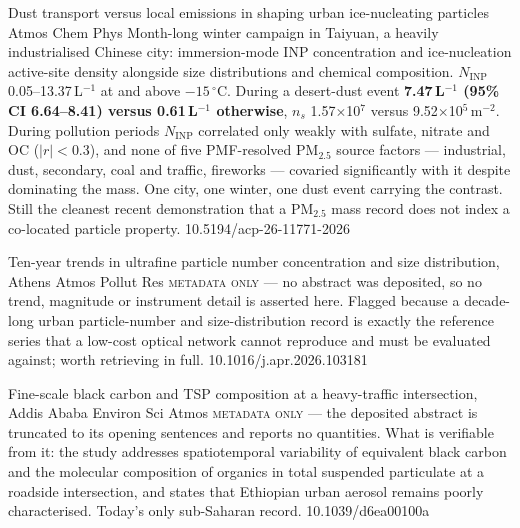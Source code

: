 \documentclass[10pt]{article}
\begin{document}
{Dust transport versus local emissions in shaping urban ice-nucleating particles}
{Atmos Chem Phys}
{Month-long winter campaign in Taiyuan, a heavily industrialised Chinese city: immersion-mode
INP concentration and ice-nucleation active-site density alongside size distributions and
chemical composition. $N_{\mathrm{INP}}$ 0.05--13.37\,L$^{-1}$ at and above $-15\,^\circ$C.
During a desert-dust event \textbf{7.47\,L$^{-1}$ (95\% CI 6.64--8.41) versus 0.61\,L$^{-1}$
otherwise}, $n_s$ 1.57$\times$10$^7$ versus 9.52$\times$10$^5$\,m$^{-2}$. During pollution
periods $N_{\mathrm{INP}}$ correlated only weakly with sulfate, nitrate and OC ($|r|<0.3$),
and none of five PMF-resolved PM$_{2.5}$ source factors --- industrial, dust, secondary, coal
and traffic, fireworks --- covaried significantly with it despite dominating the mass. One
city, one winter, one dust event carrying the contrast. Still the cleanest recent
demonstration that a PM$_{2.5}$ mass record does not index a co-located particle property.}
{10.5194/acp-26-11771-2026}

{Ten-year trends in ultrafine particle number concentration and size distribution, Athens}
{Atmos Pollut Res}
{\textsc{metadata only} --- no abstract was deposited, so no trend, magnitude or instrument
detail is asserted here. Flagged because a decade-long urban particle-number and
size-distribution record is exactly the reference series that a low-cost optical network
cannot reproduce and must be evaluated against; worth retrieving in full.}
{10.1016/j.apr.2026.103181}

{Fine-scale black carbon and TSP composition at a heavy-traffic intersection, Addis Ababa}
{Environ Sci Atmos}
{\textsc{metadata only} --- the deposited abstract is truncated to its opening sentences and
reports no quantities. What is verifiable from it: the study addresses spatiotemporal
variability of equivalent black carbon and the molecular composition of organics in total
suspended particulate at a roadside intersection, and states that Ethiopian urban aerosol
remains poorly characterised. Today's only sub-Saharan record.}
{10.1039/d6ea00100a}

\end{document}
